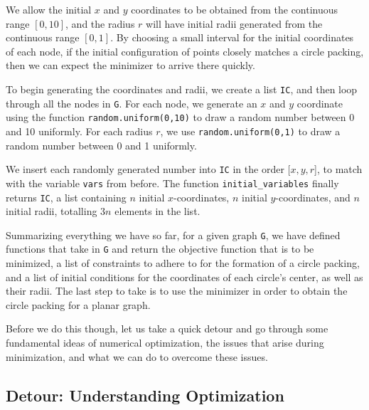 \begin{flushleft}
We allow the initial $x$ and $y$ coordinates to be obtained from the continuous range $[0,10]$, and the radius $r$ will have initial radii generated from the continuous range $[0,1]$. By choosing a small interval for the initial coordinates of each node, if the initial configuration of points closely matches a circle packing, then we can expect the minimizer to arrive there quickly.
\end{flushleft}

\begin{flushleft}
To begin generating the coordinates and radii, we create a list \texttt{IC}, and then loop through all the nodes in \texttt{G}. For each node, we generate an $x$ and $y$ coordinate using the function \texttt{random.uniform(0,10)} to draw a random number between 0 and 10 uniformly. For each radius $r$, we use \texttt{random.uniform(0,1)} to draw a random number between 0 and 1 uniformly.
\end{flushleft}

\begin{flushleft}
We insert each randomly generated number into \texttt{IC} in the order [$x,y,r$], to match with the variable \texttt{vars} from before. The function \texttt{initial\_variables} finally returns \texttt{IC}, a list containing $n$ initial $x$-coordinates, $n$ initial $y$-coordinates, and $n$ initial radii, totalling $3n$ elements in the list.
\end{flushleft}

\begin{flushleft}
Summarizing everything we have so far, for a given graph \texttt{G}, we have defined functions that take in \texttt{G} and return the objective function that is to be minimized, a list of constraints to adhere to for the formation of a circle packing, and a list of initial conditions for the coordinates of each circle's center, as well as their radii. The last step to take is to use the minimizer in order to obtain the circle packing for a planar graph.
\end{flushleft}

\begin{flushleft}
Before we do this though, let us take a quick detour and go through some fundamental ideas of numerical optimization, the issues that arise during minimization, and what we can do to overcome these issues. 
\end{flushleft}

\subsection{Detour: Understanding Optimization}

